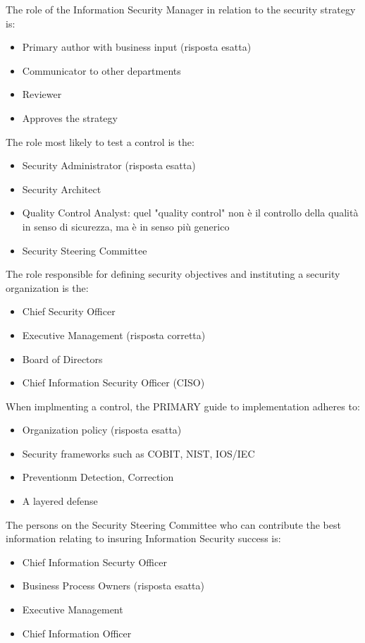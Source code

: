
The role of the Information Security Manager in relation to the security 
strategy is:
\begin{itemize}
\item Primary author with business input (risposta esatta)
\item Communicator to other departments
\item Reviewer
\item Approves the strategy
\end{itemize}


The role most likely to test a control is the:
\begin{itemize}
\item Security Administrator (risposta esatta)
\item Security Architect
\item Quality Control Analyst: quel "quality control" non è il controllo della 
qualità in senso di sicurezza, ma è in senso più generico
\item Security Steering Committee
\end{itemize}


The role responsible for defining security objectives and instituting a security 
organization is the:
\begin{itemize}
\item Chief Security Officer
\item Executive Management (risposta corretta)
\item Board of Directors
\item Chief Information Security Officer (CISO)
\end{itemize}


When implmenting a control, the PRIMARY guide to implementation adheres to:
\begin{itemize}
\item Organization policy  (risposta esatta)
\item Security frameworks such as COBIT, NIST, IOS/IEC
\item Preventionm Detection, Correction
\item A layered defense
\end{itemize}



The persons on the Security Steering Committee who can contribute the best 
information relating to insuring Information Security success is:
\begin{itemize}
\item Chief Information Securty Officer
\item Business Process Owners (risposta esatta)
\item Executive Management
\item Chief Information Officer
\end{itemize}



